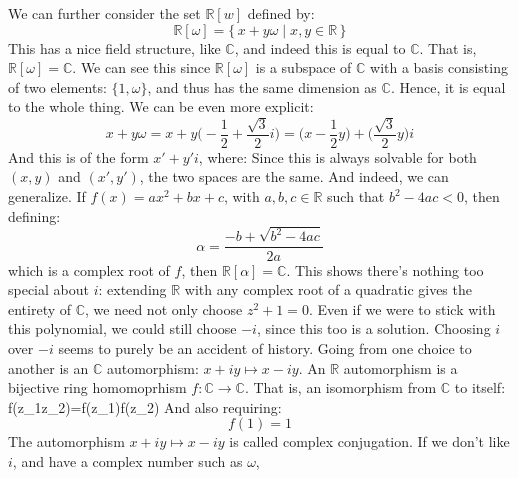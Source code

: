     We can further consider the set $\mathbb{R}[w]$ defined by:
    \begin{equation}
        \mathbb{R}[\omega]=\{\,x+y\omega\;|\;x,y\in\mathbb{R}\,\}
    \end{equation}
    This has a nice field structure, like $\mathbb{C}$, and indeed this
    is equal to $\mathbb{C}$. That is, $\mathbb{R}[\omega]=\mathbb{C}$.
    We can see this since $\mathbb{R}[\omega]$ is a subspace of
    $\mathbb{C}$ with a basis consisting of two elements:
    $\{1,\omega\}$, and thus has the same dimension as $\mathbb{C}$.
    Hence, it is equal to the whole thing. We can be even more explicit:
    \begin{equation}
        x+y\omega
            =x+y\big(\minus\frac{1}{2}+\frac{\sqrt{3}}{2}i\big)
            =\big(x-\frac{1}{2}y\big)+\big(\frac{\sqrt{3}}{2}y\big)i
    \end{equation}
    And this is of the form $x'+y'i$, where:
    Since this is always solvable for both $(x,y)$ and $(x',y')$, the
    two spaces are the same. And indeed, we can generalize. If
    $f(x)=ax^{2}+bx+c$, with $a,b,c\in\mathbb{R}$ such that
    $b^{2}-4ac<0$, then defining:
    \begin{equation}
        \alpha=\frac{\minus{b}+\sqrt{b^{2}-4ac}}{2a}
    \end{equation}
    which is a complex root of $f$, then
    $\mathbb{R}[\alpha]=\mathbb{C}$. This shows there's nothing too
    special about $i$: extending $\mathbb{R}$ with any complex root of
    a quadratic gives the entirety of $\mathbb{C}$, we need not only
    choose $z^{2}+1=0$. Even if we were to stick with this polynomial,
    we could still choose $\minus{i}$, since this too is a solution.
    Choosing $i$ over $\minus{i}$ seems to purely be an accident of
    history. Going from one choice to another is an
    $\mathbb{C}$ automorphism: $x+iy\mapsto{x}-iy$. An $\mathbb{R}$
    automorphism is a bijective ring homomoprhism
    $f:\mathbb{C}\rightarrow\mathbb{C}$. That is, an isomorphism from
    $\mathbb{C}$ to itself:
                      {f(z_{1}z_{2})=f(z_{1})f(z_{2})}
    And also requiring:
    \begin{equation}
            f(1)=1
    \end{equation}
    The automorphism $x+iy\mapsto{x}-iy$ is called complex conjugation.
    If we don't like $i$, and have a complex number such as $\omega$,

